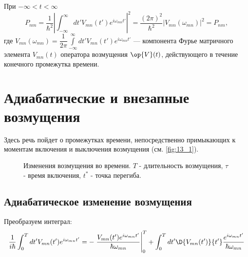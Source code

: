 При $-\infty < t < \infty$
$$
P_{nm} = \frac{1}{\hbar^2} \left | \int_{-\infty}^\infty dt' V_{mn}(t')e^{i \omega_{mn}t'} \right |^2 = \boxed{\frac{(2\pi)^2}{\hbar^2} \left | V_{mn}(\omega_{mn})\right|^2} = P_{nm},
$$
где $V_{mn}(\omega_{mn}) = \dfrac{1}{2\pi} \int \limits_{-\infty}^\infty dt' V_{mn}(t') e^{i\omega_{mn}t'}$ --- компонента Фурье матричного элемента $V_{mn}(t)$ оператора возмущения $\op{V}(t)$, действующего в течение конечного промежутка времени.

\section{Адиабатические и внезапные возмущения}

Здесь речь пойдет о промежутках времени, непосредственно примыкающих к моментам включения и выключения возмущения (см. \autoref{fig:13_1}).
\begin{figure}[h!]
\centering
{}
\caption{Изменения возмущения во времени. $T$ - длительность возмущения, $\tau$ - время включения, $t^*$ - точка перегиба.} \label{fig:13_1}
\end{figure}

\subsection{Адиабатическое изменение возмущения}

Преобразуем интеграл:
\begin{eqnarray*}
\frac{1}{i\hbar} \int_0^T dt' V_{mn}(t')e^{i\omega_{mn}t'} = -\left. \frac{V_{mn}(t')e^{i \omega_{mn}t'}}{\hbar \omega_{mn}}\right|_0^T + \int_0^T dt' \D{V_{mn}(t')}{t'} \frac{e^{i\omega_{mn}t'}}{\hbar \omega_{mn}}
\end{eqnarray*}

